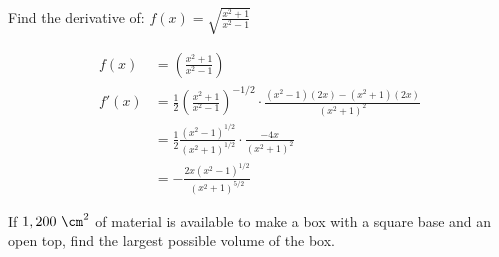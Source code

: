 \documentclass[fleqn,addpoints]{exam}
\begin{document}
\begin{questions}

\question
Find the derivative of: $f(x) = \sqrt{\frac{x^2 + 1}{x^2 - 1}}$

\begin{solution}
\begin{align*}
  f(x) &= \left( \frac{x^2 + 1}{x^2 - 1} \right) \\
  f'(x) &= \frac{1}{2} \left( \frac{x^2 + 1}{x^2 - 1} \right)^{-1/2} 
               \cdot \frac{(x^2 - 1)(2x) - (x^2 + 1)(2x)}{(x^2 + 1)^2} \\
    &= \frac{1}{2} \frac{(x^2 - 1)^{1/2}}{(x^2 + 1)^{1/2}} \cdot \frac{-4x}{(x^2 + 1)^2} \\
    &= - \frac{2x (x^2 - 1)^{1/2}}{(x^2 + 1)^{5/2}}
\end{align*}

\end{solution}

\question
If $1,200 \ \cm^2$ of material is available to make a box with a square base and an open top, find the largest possible volume
of the box.


\end{questions}
\end{document}
